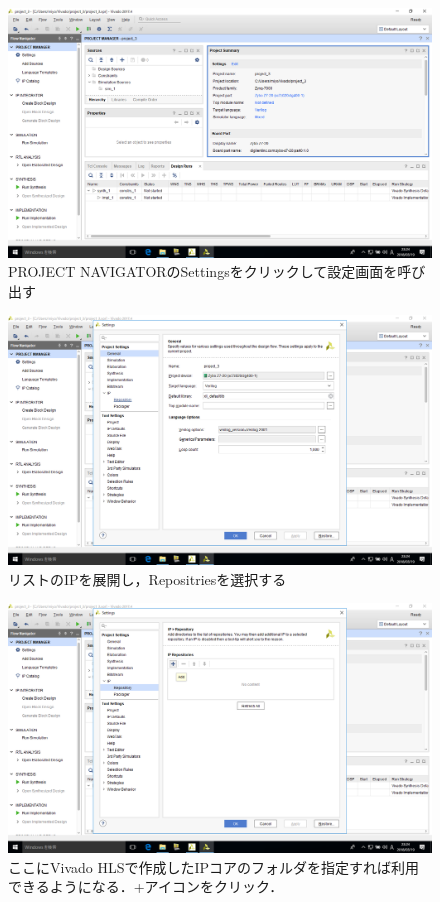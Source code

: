\documentclass[a4paper,dvipdfmx]{jsarticle}
\begin{document}
 \begin{figure}[H]
  \begin{center}
   \includegraphics[width=.8\textwidth]{chapter08_figures/VirtualBox_Windows10_19_03_2018_23_24_25.png}
  \end{center}
  \caption{PROJECT NAVIGATORのSettingsをクリックして設定画面を呼び出す}
 \end{figure}

 \begin{figure}[H]
  \begin{center}
   \includegraphics[width=.8\textwidth]{chapter08_figures/VirtualBox_Windows10_19_03_2018_23_24_37.png}
  \end{center}
  \caption{リストのIPを展開し，Repositriesを選択する}
 \end{figure}

 \begin{figure}[H]
  \begin{center}
   \includegraphics[width=.8\textwidth]{chapter08_figures/VirtualBox_Windows10_19_03_2018_23_24_43.png}
  \end{center}
  \caption{ここにVivado HLSで作成したIPコアのフォルダを指定すれば利用できるようになる．+アイコンをクリック．}
 \end{figure}
\end{document}
